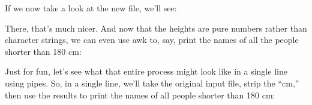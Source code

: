 \documentclass[10pt]{article}
\begin{document}
If we now take a look at the new file, we'll see:

\ttfamily
\colorbox{black}{\color{white}{
user@host:$\sim$\$  cat heights\_without\_units.txt\\
}}

\colorbox{black}{}
\normalfont

There, that's much nicer. And now that the heights are pure numbers rather than character strings, we can even use awk to, say, print the names of all the people shorter than 180 cm:

\ttfamily
\colorbox{black}{}
\normalfont

Just for fun, let's see what that entire process might look like in a single line using pipes. So, in a single line, we'll take the original input file, strip the ``cm,'' then use the results to print the names of all people shorter than 180 cm:

%
%
%
%
%
%
%
%
%
%
%
%
%
%



\end{document}
